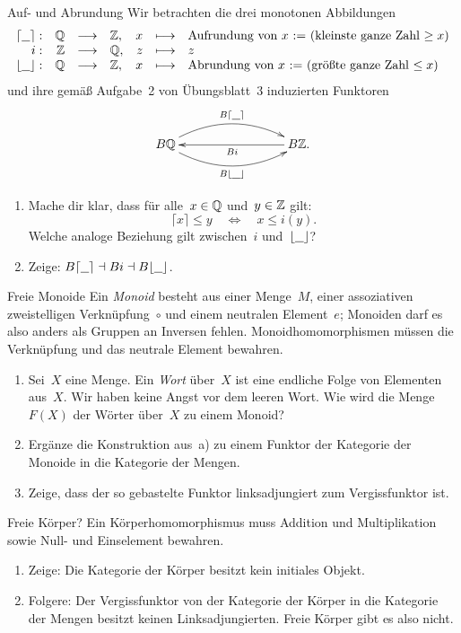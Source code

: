 \documentclass{pizzablatt}
\begin{document}

\begin{aufgabe}{Auf- und Abrundung}
Wir betrachten die drei monotonen Abbildungen
\[ \begin{array}{@{}rrclrcl@{}}
  \lceil\freist\rceil: & \QQ &\longrightarrow& \ZZ, &
  x &\longmapsto& \text{Aufrundung von~$x$ := (kleinste ganze Zahl~$\geq x$)} \\
  i: & \ZZ &\longrightarrow& \QQ, &
  z &\longmapsto& z \\
  \lfloor\freist\rfloor: & \QQ &\longrightarrow& \ZZ, &
  x &\longmapsto& \text{Abrundung von~$x$ := (größte ganze Zahl~$\leq x$)}
\end{array} \]
und ihre gemäß Aufgabe~2 von Übungsblatt~3 induzierten Funktoren
\[ \xymatrixcolsep{7pc}\xymatrix{
  B\QQ
    \ar@/^1.4pc/[r]^{B\lceil\freist\rceil}
    \ar@/_1.4pc/[r]_{B\lfloor\freist\rfloor}
  & B\ZZ. \ar[l]^{Bi}
} \]
\begin{enumerate}
\item Mache dir klar, dass für alle~$x \in \mathbb{Q}$ und~$y \in \mathbb{Z}$ gilt:
\[ \lceil x \rceil \leq y \quad\Longleftrightarrow\quad
  x \leq i(y). \]
Welche analoge Beziehung gilt zwischen~$i$ und~$\lfloor\underline{\ \ }\rfloor$?
\item Zeige: $B\lceil\underline{\ \ }\rceil \dashv Bi \dashv B\lfloor\underline{\ \ }\rfloor$.
\end{enumerate}
\end{aufgabe}

\begin{aufgabe}{Freie Monoide}
Ein \emph{Monoid} besteht aus einer Menge~$M$, einer assoziativen
zweistelligen Verknüpfung~$\circ$ und einem neutralen Element~$e$; Monoiden
darf es also anders als Gruppen an Inversen fehlen. Monoidhomomorphismen müssen
die Verknüpfung und das neutrale Element bewahren.
\begin{enumerate}
\item
Sei~$X$ eine Menge. Ein \emph{Wort} über~$X$ ist eine endliche Folge von
Elementen aus~$X$. Wir haben keine Angst vor dem leeren Wort. Wie wird die
Menge~$F(X)$ der Wörter über~$X$ zu einem Monoid?
\item Ergänze die Konstruktion aus~a) zu einem Funktor der Kategorie der
Monoide in die Kategorie der Mengen.
\item Zeige, dass der so gebastelte Funktor linksadjungiert zum Vergissfunktor
ist.
\end{enumerate}
\end{aufgabe}

\begin{aufgabe}{Freie Körper?}
Ein Körperhomomorphismus muss Addition und Multiplikation sowie Null- und
Einselement bewahren.
\begin{enumerate}
\item Zeige: Die Kategorie der Körper besitzt kein initiales Objekt.
\item Folgere: Der Vergissfunktor von der Kategorie der Körper in die Kategorie
der Mengen besitzt keinen Linksadjungierten. Freie Körper gibt es also nicht.
\end{enumerate}
\end{aufgabe}
\end{document}
